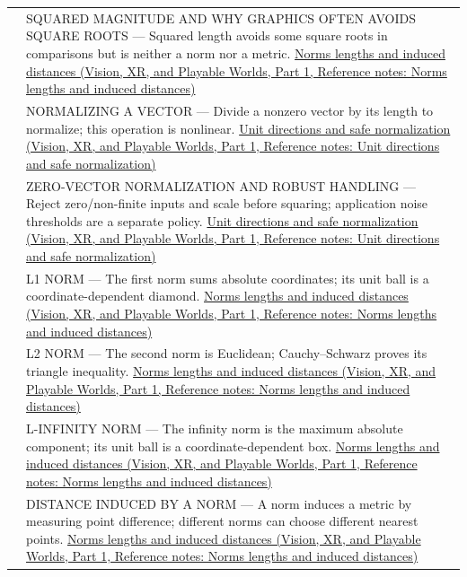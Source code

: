 {\begin{longtable}[]{@{}
  >{\raggedright\arraybackslash}p{}
  >{\raggedright\arraybackslash}p{}@{}}
527 & SQUARED MAGNITUDE AND WHY GRAPHICS OFTEN AVOIDS SQUARE ROOTS --- Squared length avoids some square roots in comparisons but is neither a norm nor a metric. \href{../07-Vision-XR-and-Playable-Worlds-P01/main.pdf\#nameddest=appendix-49933872bb51}{Norms lengths and induced distances (Vision, XR, and Playable Worlds, Part 1, Reference notes: Norms lengths and induced distances)} \\
528 & NORMALIZING A VECTOR --- Divide a nonzero vector by its length to normalize; this operation is nonlinear. \href{../07-Vision-XR-and-Playable-Worlds-P01/main.pdf\#nameddest=appendix-f744e41b95b4}{Unit directions and safe normalization (Vision, XR, and Playable Worlds, Part 1, Reference notes: Unit directions and safe normalization)} \\
529 & ZERO-VECTOR NORMALIZATION AND ROBUST HANDLING --- Reject zero/non-finite inputs and scale before squaring; application noise thresholds are a separate policy. \href{../07-Vision-XR-and-Playable-Worlds-P01/main.pdf\#nameddest=appendix-f744e41b95b4}{Unit directions and safe normalization (Vision, XR, and Playable Worlds, Part 1, Reference notes: Unit directions and safe normalization)} \\
530 & L1 NORM --- The first norm sums absolute coordinates; its unit ball is a coordinate-dependent diamond. \href{../07-Vision-XR-and-Playable-Worlds-P01/main.pdf\#nameddest=appendix-49933872bb51}{Norms lengths and induced distances (Vision, XR, and Playable Worlds, Part 1, Reference notes: Norms lengths and induced distances)} \\
531 & L2 NORM --- The second norm is Euclidean; Cauchy--Schwarz proves its triangle inequality. \href{../07-Vision-XR-and-Playable-Worlds-P01/main.pdf\#nameddest=appendix-49933872bb51}{Norms lengths and induced distances (Vision, XR, and Playable Worlds, Part 1, Reference notes: Norms lengths and induced distances)} \\
532 & L-INFINITY NORM --- The infinity norm is the maximum absolute component; its unit ball is a coordinate-dependent box. \href{../07-Vision-XR-and-Playable-Worlds-P01/main.pdf\#nameddest=appendix-49933872bb51}{Norms lengths and induced distances (Vision, XR, and Playable Worlds, Part 1, Reference notes: Norms lengths and induced distances)} \\
533 & DISTANCE INDUCED BY A NORM --- A norm induces a metric by measuring point difference; different norms can choose different nearest points. \href{../07-Vision-XR-and-Playable-Worlds-P01/main.pdf\#nameddest=appendix-49933872bb51}{Norms lengths and induced distances (Vision, XR, and Playable Worlds, Part 1, Reference notes: Norms lengths and induced distances)} \\

\end{longtable}}
